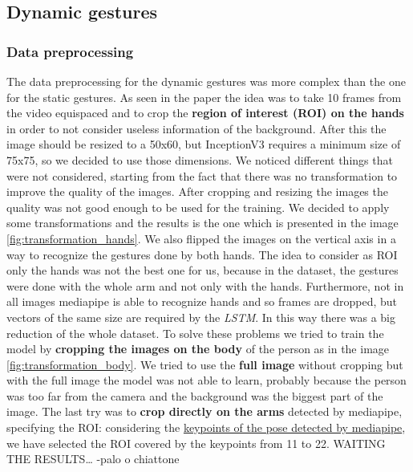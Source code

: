 \documentclass[10pt,twocolumn,letterpaper]{article}
\begin{document}
\subsection{Dynamic gestures}
\subsubsection{Data preprocessing}
\label{subsec:datapreprocessing}
The data preprocessing for the dynamic gestures was more complex than the one for the static gestures. As seen in the 
paper \cite{electronics13163233} the idea was to take 10 frames from the video equispaced and to crop the 
\textbf{region of interest (ROI) on the hands} in order to not consider useless information of the background.
After this the image should be resized to a 50x60, but InceptionV3 requires a minimum size 
of 75x75, so we decided to use those dimensions.
We noticed different things that were not considered, starting from the fact that there was no transformation 
to improve the quality of the images. After cropping and resizing the images the quality was 
not good enough to be used for the training. We decided to apply some transformations and the results is the 
one which is presented in the image \ref{fig:transformation_hands}.
We also flipped the images on the vertical axis in a way to recognize the gestures done by both hands.
The idea to consider as ROI only the hands was not the best one for us, because in the dataset, the gestures 
were done with the whole arm and not only with the hands. Furthermore, not in all images mediapipe is able to 
recognize hands and so frames are dropped, but vectors of the same size are required by the \textit{LSTM}. In this way there was a big reduction of the whole dataset.
To solve these problems we tried to train the model by \textbf{cropping the images on the body} of the person 
as in the image \ref{fig:transformation_body}.
We tried to use the \textbf{full image} without cropping but with the full image the model was not able to learn, probably 
because the person was too far from the camera and the background was the biggest part of the image.
The last try was to \textbf{crop directly on the arms} detected by mediapipe, specifying the ROI: considering the \href{https://ai.google.dev/static/mediapipe/images/solutions/pose_landmarks_index.png}{keypoints of the pose detected by mediapipe}, we have selected the ROI covered by the keypoints from 11 to 22. WAITING THE RESULTS\dots
-palo o chiattone
\end{document}
